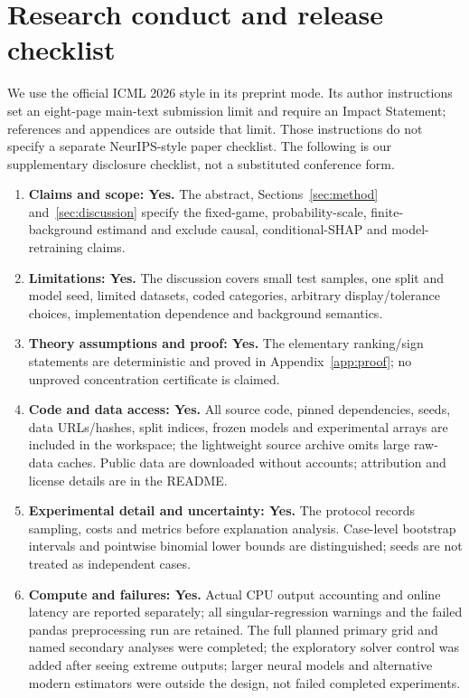 \section{Research conduct and release checklist}
\label{app:checklist}
We use the official ICML 2026 style in its preprint mode. Its author instructions set an eight-page main-text submission limit and require an Impact Statement; references and appendices are outside that limit. Those instructions do not specify a separate NeurIPS-style paper checklist. The following is our supplementary disclosure checklist, not a substituted conference form.
\begin{enumerate}
\item \textbf{Claims and scope: Yes.} The abstract, Sections~\ref{sec:method} and~\ref{sec:discussion} specify the fixed-game, probability-scale, finite-background estimand and exclude causal, conditional-SHAP and model-retraining claims.
\item \textbf{Limitations: Yes.} The discussion covers small test samples, one split and model seed, limited datasets, coded categories, arbitrary display/tolerance choices, implementation dependence and background semantics.
\item \textbf{Theory assumptions and proof: Yes.} The elementary ranking/sign statements are deterministic and proved in Appendix~\ref{app:proof}; no unproved concentration certificate is claimed.
\item \textbf{Code and data access: Yes.} All source code, pinned dependencies, seeds, data URLs/hashes, split indices, frozen models and experimental arrays are included in the workspace; the lightweight source archive omits large raw-data caches. Public data are downloaded without accounts; attribution and license details are in the README.
\item \textbf{Experimental detail and uncertainty: Yes.} The protocol records sampling, costs and metrics before explanation analysis. Case-level bootstrap intervals and pointwise binomial lower bounds are distinguished; seeds are not treated as independent cases.
\item \textbf{Compute and failures: Yes.} Actual CPU output accounting and online latency are reported separately; all singular-regression warnings and the failed pandas preprocessing run are retained. The full planned primary grid and named secondary analyses were completed; the exploratory solver control was added after seeing extreme outputs; larger neural models and alternative modern estimators were outside the design, not failed completed experiments.

\end{enumerate}
